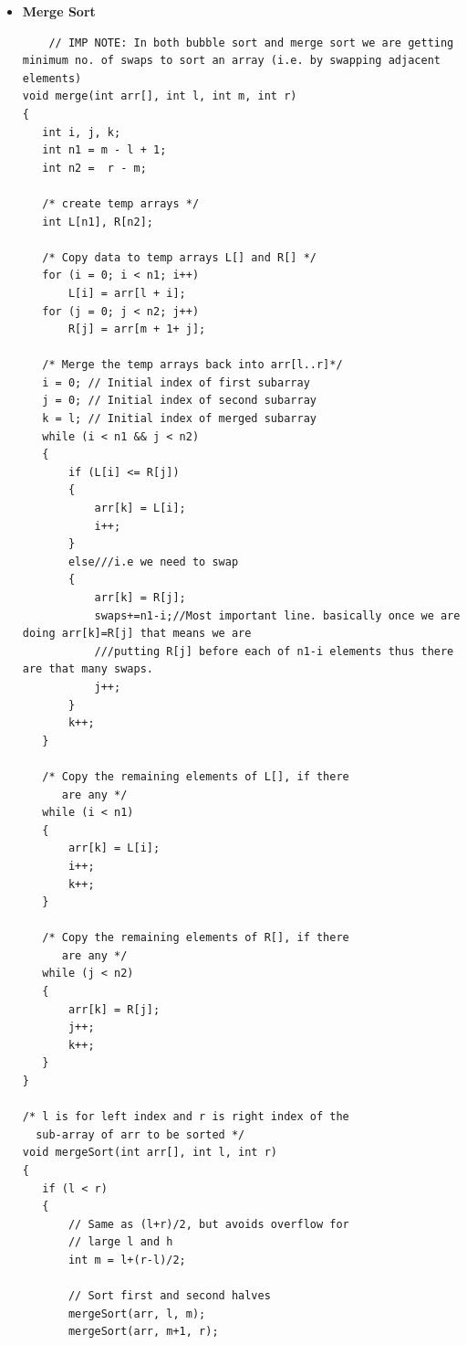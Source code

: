 \documentclass[8pt, a4paper, oneside, twocolumn]{extarticle}
\begin{document}
\begin{itemize}
\begin{enumerate}
        \item Else, if there are fewer than two values in stack, show error. Else, pop top 2 expressions from stack (say e1, e2), put the operator (op) between them and push to stack ((e1 op e2))
        \item After reading postfix expression, Stack should have only one item which is our answer 
        \end{enumerate}
    \item \textbf{Merge Sort}
    \begin{verbatim}
    // IMP NOTE: In both bubble sort and merge sort we are getting minimum no. of swaps to sort an array (i.e. by swapping adjacent elements)
void merge(int arr[], int l, int m, int r)
{
   int i, j, k;
   int n1 = m - l + 1;
   int n2 =  r - m;

   /* create temp arrays */
   int L[n1], R[n2];

   /* Copy data to temp arrays L[] and R[] */
   for (i = 0; i < n1; i++)
       L[i] = arr[l + i];
   for (j = 0; j < n2; j++)
       R[j] = arr[m + 1+ j];

   /* Merge the temp arrays back into arr[l..r]*/
   i = 0; // Initial index of first subarray
   j = 0; // Initial index of second subarray
   k = l; // Initial index of merged subarray
   while (i < n1 && j < n2)
   {
       if (L[i] <= R[j])
       {
           arr[k] = L[i];
           i++;
       }
       else///i.e we need to swap
       {
           arr[k] = R[j];
           swaps+=n1-i;//Most important line. basically once we are doing arr[k]=R[j] that means we are
           ///putting R[j] before each of n1-i elements thus there are that many swaps.
           j++;
       }
       k++;
   }

   /* Copy the remaining elements of L[], if there
      are any */
   while (i < n1)
   {
       arr[k] = L[i];
       i++;
       k++;
   }

   /* Copy the remaining elements of R[], if there
      are any */
   while (j < n2)
   {
       arr[k] = R[j];
       j++;
       k++;
   }
}

/* l is for left index and r is right index of the
  sub-array of arr to be sorted */
void mergeSort(int arr[], int l, int r)
{
   if (l < r)
   {
       // Same as (l+r)/2, but avoids overflow for
       // large l and h
       int m = l+(r-l)/2;

       // Sort first and second halves
       mergeSort(arr, l, m);
       mergeSort(arr, m+1, r);


\end{verbatim}
\end{itemize}
\end{document}
